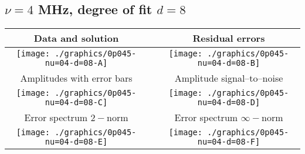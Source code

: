 

% 

\clearpage{}
\break{}

\subsection{$\nu = 4$ MHz, degree of fit $d = 8$}

\begin{table}[h]
    \begin{center}
        \begin{tabular}{ccc}
            Data and solution & \quad & Residual errors \\\hline
            \texttt{[image: ./graphics/0p045-nu=04-d=08-A]} &&
            \texttt{[image: ./graphics/0p045-nu=04-d=08-B]} \\[15pt]
            Amplitudes with error bars && Amplitude signal--to--noise \\\hline
            \texttt{[image: ./graphics/0p045-nu=04-d=08-C]} &&
            \texttt{[image: ./graphics/0p045-nu=04-d=08-D]} \\[15pt]
            Error spectrum $2-$norm && Error spectrum $\infty-$norm \\\hline
            \texttt{[image: ./graphics/0p045-nu=04-d=08-E]} &&
            \texttt{[image: ./graphics/0p045-nu=04-d=08-F]} \\[15pt]
        \end{tabular}
    \end{center}
\label{fig:elev=45, nu=4}
\end{table}



\endinput
